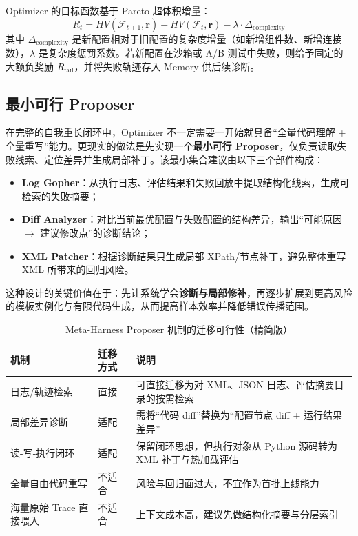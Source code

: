 Optimizer 的目标函数基于 Pareto 超体积增量：
\begin{equation}
R_t = HV(\mathcal{F}_{t+1}, \mathbf{r}) - HV(\mathcal{F}_t, \mathbf{r}) - \lambda \cdot \Delta_{\text{complexity}}
\end{equation}
其中 $\Delta_{\text{complexity}}$ 是新配置相对于旧配置的复杂度增量（如新增组件数、新增连接数），$\lambda$ 是复杂度惩罚系数。若新配置在沙箱或 A/B 测试中失败，则给予固定的大额负奖励 $R_{\text{fail}}$，并将失败轨迹存入 Memory 供后续诊断。

\subsection{最小可行 Proposer}

在完整的自我重长闭环中，Optimizer 不一定需要一开始就具备“全量代码理解 + 全量重写”能力。更现实的做法是先实现一个\textbf{最小可行 Proposer}，仅负责读取失败线索、定位差异并生成局部补丁。该最小集合建议由以下三个部件构成：

\begin{itemize}
    \item \textbf{Log Gopher}：从执行日志、评估结果和失败回放中提取结构化线索，生成可检索的失败摘要；
    \item \textbf{Diff Analyzer}：对比当前最优配置与失败配置的结构差异，输出“可能原因 $\rightarrow$ 建议修改点”的诊断结论；
    \item \textbf{XML Patcher}：根据诊断结果只生成局部 XPath/节点补丁，避免整体重写 XML 所带来的回归风险。
\end{itemize}

这种设计的关键价值在于：先让系统学会\textbf{诊断与局部修补}，再逐步扩展到更高风险的模板实例化与有限代码生成，从而提高样本效率并降低错误传播范围。

\begin{table}[htbp]
\centering
\caption{Meta-Harness Proposer 机制的迁移可行性（精简版）}
\label{tab:minimal_proposer_migration}
\begin{tabular}{p{3.5cm}p{2.4cm}p{7.0cm}}
\hline
\textbf{机制} & \textbf{迁移方式} & \textbf{说明} \\
\hline
日志/轨迹检索 & 直接 & 可直接迁移为对 XML、JSON 日志、评估摘要目录的按需检索 \\
局部差异诊断 & 适配 & 需将“代码 diff”替换为“配置节点 diff + 运行结果差异” \\
读-写-执行闭环 & 适配 & 保留闭环思想，但执行对象从 Python 源码转为 XML 补丁与热加载评估 \\
全量自由代码重写 & 不适合 & 风险与回归面过大，不宜作为首批上线能力 \\
海量原始 Trace 直接喂入 & 不适合 & 上下文成本高，建议先做结构化摘要与分层索引 \\
\hline
\end{tabular}
\end{table}

